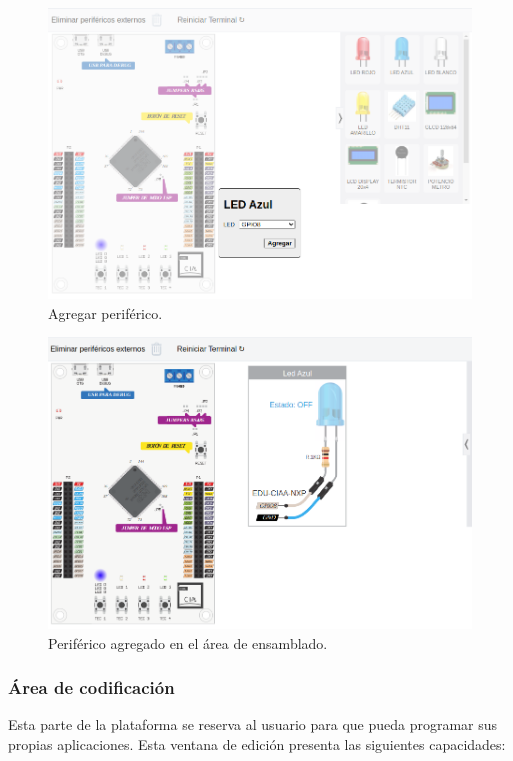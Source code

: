 \begin{figure}[ht]
	\centering
	\includegraphics[scale=.33]{./Figures/AgregarPeriferico.png}
	\caption{Agregar periférico.}
	\label{fig:AgregarPeriferico}
\end{figure}


\begin{figure}[ht]
	\centering
	\includegraphics[scale=.33]{./Figures/AgregarPeriferico2.png}
	\caption{Periférico agregado en el área de ensamblado. }
	\label{fig:AgregarPeriferico2}
\end{figure}


\subsubsection{Área de codificación}

Esta parte de la plataforma se reserva al usuario para que pueda programar sus propias aplicaciones. Esta ventana de edición presenta las siguientes capacidades:

